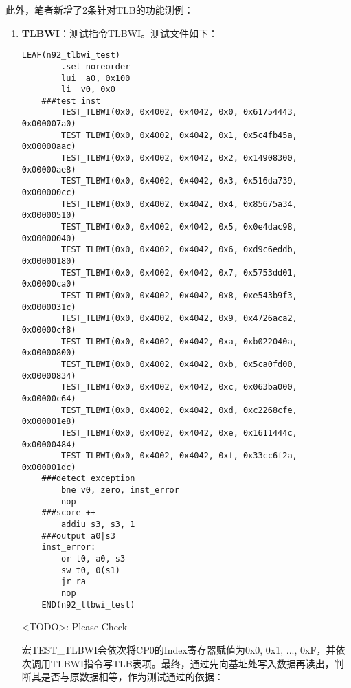 此外，笔者新增了2条针对TLB的功能测例：

\begin{enumerate}
    \item {\bf TLBWI}：测试指令TLBWI。测试文件如下：

    \begin{lstlisting}[caption={n92\_tlbwi.S}, emph={TEST\_TLBWI}]
    LEAF(n92_tlbwi_test)
        .set noreorder
        lui  a0, 0x100
        li  v0, 0x0
    ###test inst
        TEST_TLBWI(0x0, 0x4002, 0x4042, 0x0, 0x61754443, 0x000007a0)
        TEST_TLBWI(0x0, 0x4002, 0x4042, 0x1, 0x5c4fb45a, 0x00000aac)
        TEST_TLBWI(0x0, 0x4002, 0x4042, 0x2, 0x14908300, 0x00000ae8)
        TEST_TLBWI(0x0, 0x4002, 0x4042, 0x3, 0x516da739, 0x000000cc)
        TEST_TLBWI(0x0, 0x4002, 0x4042, 0x4, 0x85675a34, 0x00000510)
        TEST_TLBWI(0x0, 0x4002, 0x4042, 0x5, 0x0e4dac98, 0x00000040)
        TEST_TLBWI(0x0, 0x4002, 0x4042, 0x6, 0xd9c6eddb, 0x00000180)
        TEST_TLBWI(0x0, 0x4002, 0x4042, 0x7, 0x5753dd01, 0x00000ca0)
        TEST_TLBWI(0x0, 0x4002, 0x4042, 0x8, 0xe543b9f3, 0x0000031c)
        TEST_TLBWI(0x0, 0x4002, 0x4042, 0x9, 0x4726aca2, 0x00000cf8)
        TEST_TLBWI(0x0, 0x4002, 0x4042, 0xa, 0xb022040a, 0x00000800)
        TEST_TLBWI(0x0, 0x4002, 0x4042, 0xb, 0x5ca0fd00, 0x00000834)
        TEST_TLBWI(0x0, 0x4002, 0x4042, 0xc, 0x063ba000, 0x00000c64)
        TEST_TLBWI(0x0, 0x4002, 0x4042, 0xd, 0xc2268cfe, 0x000001e8)
        TEST_TLBWI(0x0, 0x4002, 0x4042, 0xe, 0x1611444c, 0x00000484)
        TEST_TLBWI(0x0, 0x4002, 0x4042, 0xf, 0x33cc6f2a, 0x000001dc)
    ###detect exception
        bne v0, zero, inst_error
        nop
    ###score ++
        addiu s3, s3, 1
    ###output a0|s3
    inst_error:
        or t0, a0, s3
        sw t0, 0(s1)
        jr ra
        nop
    END(n92_tlbwi_test)
    \end{lstlisting}

    <TODO>: Please Check

    宏TEST\_TLBWI会依次将CP0的Index寄存器赋值为0x0, 0x1, ..., 0xF，并依次调用TLBWI指令写TLB表项。最终，通过先向基址处写入数据再读出，判断其是否与原数据相等，作为测试通过的依据：


\end{enumerate}

